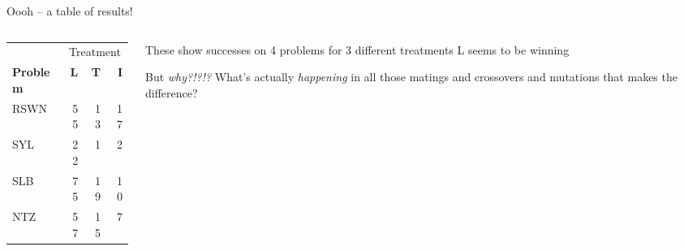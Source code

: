 \documentclass{beamer}
\newcommand{\linespace}{\vskip 0.25cm}
\begin{document}
\begin{frame}{Oooh -- a table of results!}

\begin{columns}
	\begin{column}{0.4 \linewidth}
		\centering
\begin{tabular}{lrrr}
	& \multicolumn{3}{c}{Treatment} \\ \cline{2-4}
	\textbf{Problem} & \textbf{L} & \textbf{T} & \textbf{I} \\
	\hline
	RSWN & 55 & 13 & 17 \\
	SYL & 22 & 1 & 2 \\
	SLB & 75 & 19 & 10 \\
	NTZ & 57 & 15 & 7
\end{tabular}
\end{column}

\begin{column}{0.55 \linewidth}
	\begin{overprint}
		These show successes on 4 problems for 3 different treatments
		\linespace
		L seems to be winning

		But \emph{why?!?!?}		
		\linespace
		What's actually \emph{happening} in all those matings and crossovers and mutations that makes the difference?
	\end{overprint}
\end{column}
\end{columns}
\end{frame}
\end{document}
